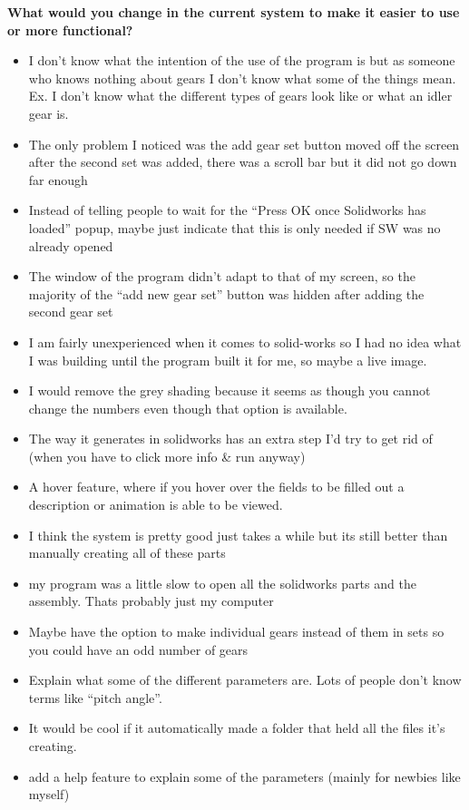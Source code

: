 \newpage
\noindent\textbf{What would you change in the current system to make it easier to use or more functional?}
\begin{itemize}
    \item I don't know what the intention of the use of the program is but as someone who knows nothing about gears I don't know what some of the things mean. Ex. I don't know what the different types of gears look like or what an idler gear is.
    \item The only problem I noticed was the add gear set button moved off the screen after the second set was added, there was a scroll bar but it did not go down far enough
    \item Instead of telling people to wait for the ``Press OK once Solidworks has loaded'' popup, maybe just indicate that this is only needed if SW was no already opened
    \item The window of the program didn't adapt to that of my screen, so the majority of the ``add new gear set'' button was hidden after adding the second gear set
    \item I am fairly unexperienced when it comes to solid-works so I had no idea what I was building until the program built it for me, so maybe a live image.
    \item I would remove the grey shading because it seems as though you cannot change the numbers even though that option is available.
    \item The way it generates in solidworks has an extra step I'd try to get rid of (when you have to click more info \& run anyway)
    \item A hover feature, where if you hover over the fields to be filled out a description or animation is able to be viewed.
    \item I think the system is pretty good just takes a while but its still better than manually creating all of these parts
    \item my program was a little slow to open all the solidworks parts and the assembly. Thats probably just my computer
    \item Maybe have the option to make individual gears instead of them in sets so you could have an odd number of gears
    \item Explain what some of the different parameters are. Lots of people don't know terms like ``pitch angle''.
    \item It would be cool if it automatically made a folder that held all the files it's creating.
    \item add a help feature to explain some of the parameters (mainly for newbies like myself)

\end{itemize}
